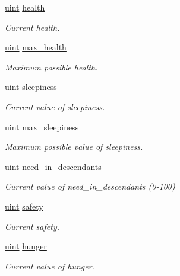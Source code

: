 \begin{DoxyCompactItemize}
\hyperlink{BasicTypes_8h_a91ad9478d81a7aaf2593e8d9c3d06a14}{uint} \hyperlink{classCreature_ab59bc1917022e01b46b23f947bb8d688}{health}
\begin{DoxyCompactList}\small\item\em Current health. \end{DoxyCompactList}\item 
\hyperlink{BasicTypes_8h_a91ad9478d81a7aaf2593e8d9c3d06a14}{uint} \hyperlink{classCreature_a0628a001b2c326388b08ea664e0c4e8f}{max\-\_\-health}
\begin{DoxyCompactList}\small\item\em Maximum possible health. \end{DoxyCompactList}\item 
\hyperlink{BasicTypes_8h_a91ad9478d81a7aaf2593e8d9c3d06a14}{uint} \hyperlink{classCreature_a3f6c69d85deb3a91a823913e67f19709}{sleepiness}
\begin{DoxyCompactList}\small\item\em Current value of sleepiness. \end{DoxyCompactList}\item 
\hyperlink{BasicTypes_8h_a91ad9478d81a7aaf2593e8d9c3d06a14}{uint} \hyperlink{classCreature_ae52439324e6404f73bf0e316fdf5a31b}{max\-\_\-sleepiness}
\begin{DoxyCompactList}\small\item\em Maximum possible value of sleepiness. \end{DoxyCompactList}\item 
\hyperlink{BasicTypes_8h_a91ad9478d81a7aaf2593e8d9c3d06a14}{uint} \hyperlink{classCreature_aed2975e3833046d705ae928dc2aed4b6}{need\-\_\-in\-\_\-descendants}
\begin{DoxyCompactList}\small\item\em Current value of need\-\_\-in\-\_\-descendants (0-\/100) \end{DoxyCompactList}\item 
\hyperlink{BasicTypes_8h_a91ad9478d81a7aaf2593e8d9c3d06a14}{uint} \hyperlink{classCreature_a898df2aff71e6908209969eea863ccf8}{safety}
\begin{DoxyCompactList}\small\item\em Current safety. \end{DoxyCompactList}\item 
\hyperlink{BasicTypes_8h_a91ad9478d81a7aaf2593e8d9c3d06a14}{uint} \hyperlink{classCreature_a0ac52285317bd2d52b3901b9c2a9c24a}{hunger}
\begin{DoxyCompactList}\small\item\em Current value of hunger. \end{DoxyCompactList}\item 

\end{DoxyCompactItemize}
